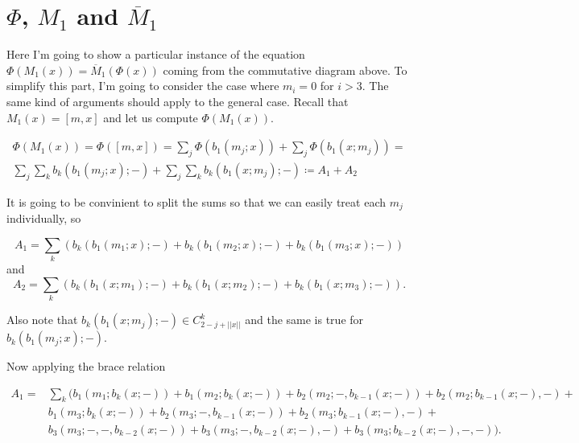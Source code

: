 \documentclass[twoside]{article}
\begin{document}

\section{$\Phi$, $M_1$ and $\overline{M}_1$}

Here I'm going to show a particular instance of the equation $\Phi(M_1(x))=\overline{M}_1(\Phi(x))$ coming from the commutative diagram above. To simplify this part, I'm going to consider the case where $m_i=0$ for $i>3$. The same kind of arguments should apply to the general case. Recall that $M_1(x)=[m,x]$ and let us compute $\Phi(M_1(x)).$ 

\begin{align}
\Phi(M_1(x))=\Phi([m,x])=\sum_j\Phi(b_1(m_j;x))+\sum_j\Phi(b_1(x;m_j))=\nonumber\\
\sum_j\sum_k b_k(b_1(m_j;x);-)+\sum_j\sum_k b_k(b_1(x;m_j);-)\coloneqq A_1+A_2
\end{align}



It is going to be convinient to split the sums so that we can easily treat each $m_j$ individually, so

$$A_1=\sum_k (b_k(b_1(m_1;x);-)+b_k(b_1(m_2;x);-)+b_k(b_1(m_3;x);-))$$
and
$$A_2=\sum_k (b_k(b_1(x;m_1);-)+b_k(b_1(x;m_2);-)+b_k(b_1(x;m_3);-)).$$

Also note that $b_k(b_1(x;m_j);-)\in C^k_{2-j+||x||}$ and the same is true for $b_k(b_1(m_j;x);-)$.

Now applying the brace relation

\begin{align*}
A_1=&\sum_k ( b_1(m_1;b_k(x;-))+b_1(m_2;b_k(x;-))+b_2(m_2;-,b_{k-1}(x;-))+b_2(m_2;b_{k-1}(x;-),-)+\\
&b_1(m_3;b_k(x;-))+b_2(m_3;-,b_{k-1}(x;-))+b_2(m_3;b_{k-1}(x;-),-)+\\
& b_3(m_3;-,-,b_{k-2}(x;-))+b_3(m_3;-,b_{k-2}(x;-),-)+b_3(m_3;b_{k-2}(x;-),-,-)).
\end{align*}


\end{document}
